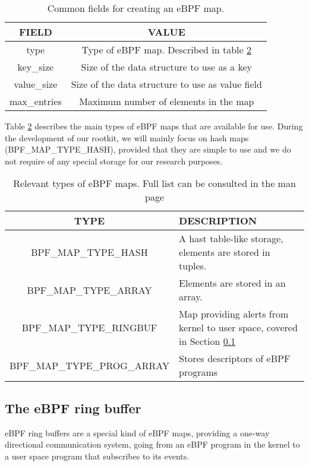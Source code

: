 \begin{table}[htbp]
\begin{tabular}{|c|c|}
\hline
\textbf{FIELD} & \textbf{VALUE}\\
\hline
\hline
type & Type of eBPF map. Described in table \ref{table:ebpf_map_types}\\
\hline
key\_size & Size of the data structure to use as a key\\
\hline
value\_size & Size of the data structure to use as value field\\
\hline
max\_entries & Maximum number of elements in the map\\
\hline
\end{tabular}
\caption{Common fields for creating an eBPF map.}
\label{table:ebpf_map_struct}
\end{table}

Table \ref{table:ebpf_map_types} describes the main types of eBPF maps that are available for use. During the development of our rootkit, we will mainly focus on hash maps (BPF\_MAP\_TYPE\_HASH), provided that they are simple to use and we do not require of any special storage for our research purposes.

\begin{table}[htbp]
\begin{tabular}{|c|>{\centering\arraybackslash}p{7cm}|}
\hline
\textbf{TYPE} & \textbf{DESCRIPTION}\\
\hline
\hline
BPF\_MAP\_TYPE\_HASH & A hast table-like storage, elements are stored in tuples.\\
\hline
BPF\_MAP\_TYPE\_ARRAY & Elements are stored in an array.\\
\hline
BPF\_MAP\_TYPE\_RINGBUF & Map providing alerts from kernel to user space, covered in Section \ref{subsection:bpf_ring_buf}\\
\hline
BPF\_MAP\_TYPE\_PROG\_ARRAY & Stores descriptors of eBPF programs\\
\hline
\hline
\end{tabular}
\caption{Relevant types of eBPF maps. Full list can be consulted in the man page \cite{bpf_syscall}}
\label{table:ebpf_map_types}
\end{table}

\subsection{The eBPF ring buffer} \label{subsection:bpf_ring_buf}
eBPF ring buffers are a special kind of eBPF maps, providing a one-way directional communication system, going from an eBPF program in the kernel to a user space program that subscribes to its events.

